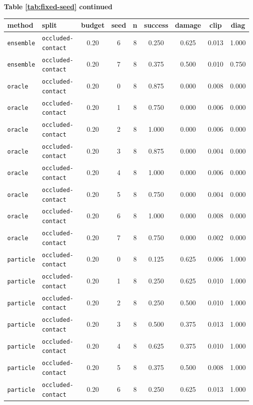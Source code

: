 \documentclass{article}
\begin{document}
\begin{center}
\textbf{Table \ref{tab:fixed-seed} continued}\\[0.4ex]
\begin{tabular}{llccccccc}
\toprule
method & split & budget & seed & n & success & damage & clip & diag \\
\midrule
\texttt{ensemble} & \texttt{occluded-contact} & 0.20 & 6 & 8 & 0.250 & 0.625 & 0.013 & 1.000 \\
\texttt{ensemble} & \texttt{occluded-contact} & 0.20 & 7 & 8 & 0.375 & 0.500 & 0.010 & 0.750 \\
\texttt{oracle} & \texttt{occluded-contact} & 0.20 & 0 & 8 & 0.875 & 0.000 & 0.008 & 0.000 \\
\texttt{oracle} & \texttt{occluded-contact} & 0.20 & 1 & 8 & 0.750 & 0.000 & 0.006 & 0.000 \\
\texttt{oracle} & \texttt{occluded-contact} & 0.20 & 2 & 8 & 1.000 & 0.000 & 0.006 & 0.000 \\
\texttt{oracle} & \texttt{occluded-contact} & 0.20 & 3 & 8 & 0.875 & 0.000 & 0.004 & 0.000 \\
\texttt{oracle} & \texttt{occluded-contact} & 0.20 & 4 & 8 & 1.000 & 0.000 & 0.006 & 0.000 \\
\texttt{oracle} & \texttt{occluded-contact} & 0.20 & 5 & 8 & 0.750 & 0.000 & 0.004 & 0.000 \\
\texttt{oracle} & \texttt{occluded-contact} & 0.20 & 6 & 8 & 1.000 & 0.000 & 0.008 & 0.000 \\
\texttt{oracle} & \texttt{occluded-contact} & 0.20 & 7 & 8 & 0.750 & 0.000 & 0.002 & 0.000 \\
\texttt{particle} & \texttt{occluded-contact} & 0.20 & 0 & 8 & 0.125 & 0.625 & 0.006 & 1.000 \\
\texttt{particle} & \texttt{occluded-contact} & 0.20 & 1 & 8 & 0.250 & 0.625 & 0.010 & 1.000 \\
\texttt{particle} & \texttt{occluded-contact} & 0.20 & 2 & 8 & 0.250 & 0.500 & 0.010 & 1.000 \\
\texttt{particle} & \texttt{occluded-contact} & 0.20 & 3 & 8 & 0.500 & 0.375 & 0.013 & 1.000 \\
\texttt{particle} & \texttt{occluded-contact} & 0.20 & 4 & 8 & 0.625 & 0.375 & 0.010 & 1.000 \\
\texttt{particle} & \texttt{occluded-contact} & 0.20 & 5 & 8 & 0.375 & 0.500 & 0.008 & 1.000 \\
\texttt{particle} & \texttt{occluded-contact} & 0.20 & 6 & 8 & 0.250 & 0.625 & 0.013 & 1.000 \\

\end{tabular}
\end{center}
\end{document}
